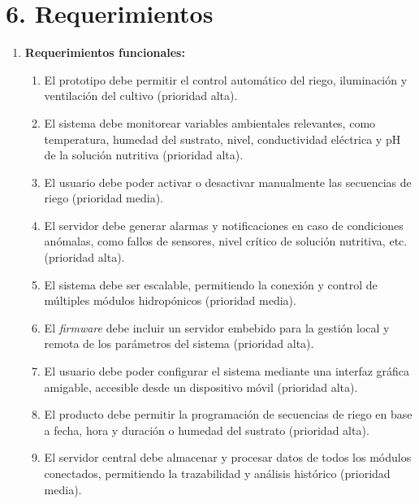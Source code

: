 \documentclass[
11pt, %
]{charter}
\begin{document}

\section{6. Requerimientos}
\label{sec:requerimientos}


\begin{enumerate}
	\item \textbf{Requerimientos funcionales:}
		\begin{enumerate}
			\item El prototipo debe permitir el control automático del riego, iluminación y ventilación del cultivo (prioridad alta).
			\item El sistema debe monitorear variables ambientales relevantes, como temperatura, humedad del sustrato, nivel, conductividad eléctrica y pH de la solución nutritiva (prioridad alta).
			\item El usuario debe poder activar o desactivar manualmente las secuencias de riego (prioridad media).
			\item El servidor debe generar alarmas y notificaciones en caso de condiciones anómalas, como fallos de sensores, nivel crítico de solución nutritiva, etc. (prioridad alta).
		\item El sistema debe ser escalable, permitiendo la conexión y control de múltiples módulos hidropónicos (prioridad media).
		\item El \textit{firmware} debe incluir un servidor embebido para la gestión local y remota de los parámetros del sistema (prioridad alta).
		\item El usuario debe poder configurar el sistema mediante una interfaz gráfica amigable, accesible desde un dispositivo móvil (prioridad alta).
		\item El producto debe permitir la programación de secuencias de riego en base a fecha, hora y duración o humedad del sustrato (prioridad alta).
		\item El servidor central debe almacenar y procesar datos de todos los módulos conectados, permitiendo la trazabilidad y análisis histórico (prioridad media).

\end{enumerate}
\end{enumerate}
\end{document}
